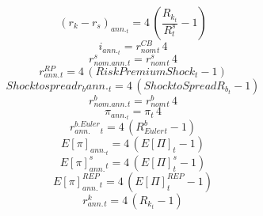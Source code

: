 \begin{dmath}
{ (r_k - r_s)_{ann.} _{t}}=4\, \left(\frac{{ R_k _{t}}}{{R^s_{t}}}-1\right)
\end{dmath}
\begin{dmath}
{ i_{ann.}_{t}}={ r^{CB}_{nom}_{t}}\, 4
\end{dmath}
\begin{dmath}
{ r^s_{nom.ann.}_{t}}={ r^s_{nom}_{t}}\, 4
\end{dmath}
\begin{dmath}
{ r^{RP}_{ann.}_{t}}=4\, \left({ Risk Premium Shock _{t}}-1\right)
\end{dmath}
\begin{dmath}
{Shock to spread r_b ann._{t}}=4\, \left({Shock to Spread R_b_{t}}-1\right)
\end{dmath}
\begin{dmath}
{ r^b_{nom.ann.}_{t}}={ r^b_{nom}_{t}}\, 4
\end{dmath}
\begin{dmath}
{ \pi_{ann.} _{t}}={ \pi _{t}}\, 4
\end{dmath}
\begin{dmath}
{ r^{b.Euler}_{ann.} _{t}}=4\, \left({ R^b_{Euler} _{t}}-1\right)
\end{dmath}
\begin{dmath}
{ E[\pi]_{ann.} _{t}}=4\, \left({ E[\Pi] _{t}}-1\right)
\end{dmath}
\begin{dmath}
{ E[\pi]_{ann.}^{s} _{t}}=4\, \left({ E[\Pi]^{s} _{t}}-1\right)
\end{dmath}
\begin{dmath}
{ E[\pi]_{ann.}^{REP} _{t}}=4\, \left({ E[\Pi]^{REP} _{t}}-1\right)
\end{dmath}
\begin{dmath}
{ r^k_{ann.} _{t}}=4\, \left({ R_k _{t}}-1\right)
\end{dmath}
